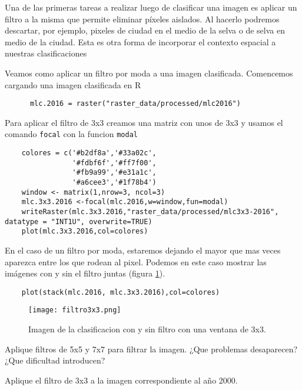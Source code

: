 Una de las primeras tareas a realizar luego de clasificar una imagen es aplicar un filtro a la misma que permite eliminar p\'ixeles aislados. Al hacerlo podremos descartar, por ejemplo, pixeles de ciudad en el medio de la selva o de selva en medio de la ciudad. Esta es otra forma de incorporar el contexto espacial a nuestras clasificaciones
\begin{exa}
  Veamos como aplicar un filtro por moda a una imagen clasificada. Comencemos cargando una imagen clasificada en R

  \begin{lstlisting}
      mlc.2016 = raster("raster_data/processed/mlc2016")
  \end{lstlisting}

  Para aplicar el filtro de 3x3 creamos una matriz con unos de 3x3 y usamos
  el comando \texttt{focal} con la funcion \texttt{modal}

  \begin{lstlisting}
    colores = c('#b2df8a','#33a02c',
                '#fdbf6f','#ff7f00',
                '#fb9a99','#e31a1c',
                '#a6cee3','#1f78b4')
    window <- matrix(1,nrow=3, ncol=3)
    mlc.3x3.2016 <-focal(mlc.2016,w=window,fun=modal)
    writeRaster(mlc.3x3.2016,"raster_data/processed/mlc3x3-2016", datatype = "INT1U", overwrite=TRUE)
    plot(mlc.3x3.2016,col=colores)
  \end{lstlisting}
  En el caso de un filtro por moda, estaremos dejando el mayor que mas veces aparezca entre los que rodean al pixel. Podemos en este caso mostrar las im\'agenes con y sin el filtro juntas (figura \ref{fig:3x3}).

  \begin{lstlisting}
    plot(stack(mlc.2016, mlc.3x3.2016),col=colores)
  \end{lstlisting}

  \begin{figure}[h!]
    \centering
    \texttt{[image: filtro3x3.png]}
    \caption{Imagen de la clasificacion con y sin filtro con una ventana de 3x3.}
    \label{fig:3x3}
  \end{figure}
\end{exa}

\begin{act}
    Aplique filtros de 5x5 y 7x7 para filtrar la imagen. ¿Que problemas desaparecen? ¿Que dificultad introducen?
\end{act}

\begin{act}
    Aplique el filtro de 3x3 a la imagen correspondiente al año 2000.
\end{act}

